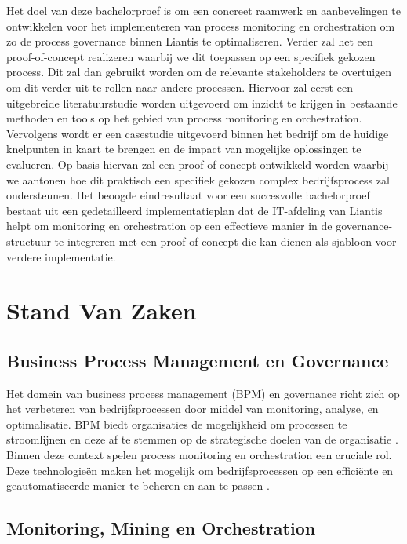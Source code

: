 Het doel van deze bachelorproef is om een concreet raamwerk en aanbevelingen te ontwikkelen voor het implementeren van process monitoring en orchestration om zo de process governance binnen Liantis te optimaliseren. Verder zal het een proof-of-concept realizeren waarbij we dit toepassen op een specifiek gekozen process. Dit zal dan gebruikt worden om de relevante stakeholders te overtuigen om dit verder uit te rollen naar andere processen.  Hiervoor zal eerst een uitgebreide literatuurstudie worden uitgevoerd om inzicht te krijgen in bestaande methoden en tools op het gebied van process monitoring en orchestration. Vervolgens wordt er een casestudie uitgevoerd binnen het bedrijf om de huidige knelpunten in kaart te brengen en de impact van mogelijke oplossingen te evalueren. Op basis hiervan zal een proof-of-concept ontwikkeld worden waarbij we aantonen hoe dit praktisch een specifiek gekozen complex bedrijfsprocess zal ondersteunen. Het beoogde eindresultaat voor een succesvolle bachelorproef bestaat uit een gedetailleerd implementatieplan dat de IT-afdeling van Liantis helpt om monitoring en orchestration op een effectieve manier in de governance-structuur te integreren met een proof-of-concept die kan dienen als sjabloon voor verdere implementatie. 


\section{Stand Van Zaken}%
\label{sec:stand_van_zaken}
\subsection{Business Process Management en Governance}

Het domein van business process management (BPM) en governance richt zich op het verbeteren van bedrijfsprocessen door middel van monitoring, analyse, en optimalisatie. BPM biedt organisaties de mogelijkheid om processen te stroomlijnen en deze af te stemmen op de strategische doelen van de organisatie \autocite{Dumas2018}. Binnen deze context spelen process monitoring en orchestration een cruciale rol. Deze technologieën maken het mogelijk om bedrijfsprocessen op een efficiënte en geautomatiseerde manier te beheren en aan te passen \autocite{Weske2019}.

\subsection{Monitoring, Mining en Orchestration}


